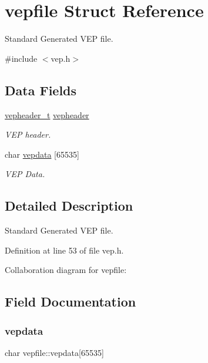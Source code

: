 \hypertarget{a00304}{}\section{vepfile Struct Reference}
\label{a00304}


Standard Generated V\+EP file.  




{\ttfamily \#include $<$vep.\+h$>$}

\subsection*{Data Fields}
\begin{DoxyCompactItemize}
\item 
\hyperlink{a00188_a78392c340e1fe1be344df81d1438b74f_a78392c340e1fe1be344df81d1438b74f}{vepheader\+\_\+t} \hyperlink{a00304_a0fa3b39f1e4974d4ed258db1d4b22402_a0fa3b39f1e4974d4ed258db1d4b22402}{vepheader}
\begin{DoxyCompactList}\small\item\em V\+EP header. \end{DoxyCompactList}\item 
char \hyperlink{a00304_a6a40903035403710bf43295c34e883e7_a6a40903035403710bf43295c34e883e7}{vepdata} \mbox{[}65535\mbox{]}
\begin{DoxyCompactList}\small\item\em V\+EP Data. \end{DoxyCompactList}\end{DoxyCompactItemize}


\subsection{Detailed Description}
Standard Generated V\+EP file. 

Definition at line 53 of file vep.\+h.



Collaboration diagram for vepfile\+:


\subsection{Field Documentation}
\mbox{\label{a00304_a6a40903035403710bf43295c34e883e7_a6a40903035403710bf43295c34e883e7}} 
\subsubsection{\texorpdfstring{vepdata}{vepdata}}
{\footnotesize\ttfamily char vepfile\+::vepdata\mbox{[}65535\mbox{]}}




